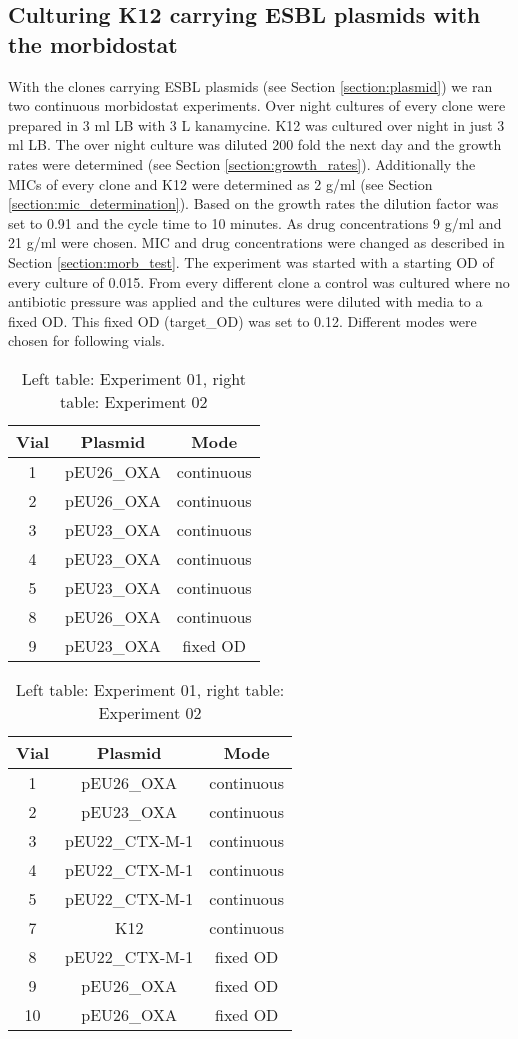 \subsection{Culturing K12 carrying ESBL plasmids with the morbidostat}
With the clones carrying ESBL plasmids (see Section \ref{section:plasmid}) we ran two continuous morbidostat experiments. Over night cultures of every clone were prepared in 3 ml LB with 3 \textmu L kanamycine. K12 was cultured over night in just 3 ml LB. The over night culture was diluted 200 fold the next day and the growth rates were determined (see Section \ref{section:growth_rates}). Additionally the MICs of every clone and K12 were determined as 2 \textmu g/ml (see Section \ref{section:mic_determination}). Based on the growth rates the dilution factor was set to 0.91 and the cycle time to 10 minutes. As drug concentrations 9 \textmu g/ml and 21 \textmu g/ml were chosen. MIC and drug concentrations were changed as described in Section \ref{section:morb_test}. The experiment was started with a starting OD of every culture of 0.015.
From every different clone a control was cultured where no antibiotic pressure was applied and the cultures were diluted with media to a fixed OD. This fixed OD (target\_OD) was set to 0.12. Different modes were chosen for following vials.

\begin{table}[H]
	\begin{tabular}{|c c c|}	
		\hline
		Vial & Plasmid & Mode \\
		\hline
		1 & pEU26\_OXA & continuous \\
		\hline
		2 & pEU26\_OXA & continuous \\
		\hline
		3 & pEU23\_OXA & continuous \\
		\hline
		4 & pEU23\_OXA & continuous \\
		\hline
		5 & pEU23\_OXA & continuous \\
		\hline
		8 & pEU26\_OXA & continuous \\
		\hline
		9 & pEU23\_OXA & fixed OD \\
		\hline
	\end{tabular}
	\quad
		\begin{tabular}{|c c c|}	
		\hline
		Vial & Plasmid & Mode \\
		\hline
		1 & pEU26\_OXA & continuous \\
		\hline
		2 & pEU23\_OXA & continuous \\
		\hline
		3 & pEU22\_CTX-M-1 & continuous \\
		\hline
		4 & pEU22\_CTX-M-1 & continuous \\
		\hline
		5 & pEU22\_CTX-M-1 & continuous \\
		\hline
		7 & K12 & continuous \\
		\hline
		8 & pEU22\_CTX-M-1 & fixed OD \\
		\hline
		9 & pEU26\_OXA & fixed OD \\
		\hline
		10 & pEU26\_OXA & fixed OD \\
		\hline
	\end{tabular}
	\caption{Left table: Experiment 01, right table: Experiment 02}
\end{table}

